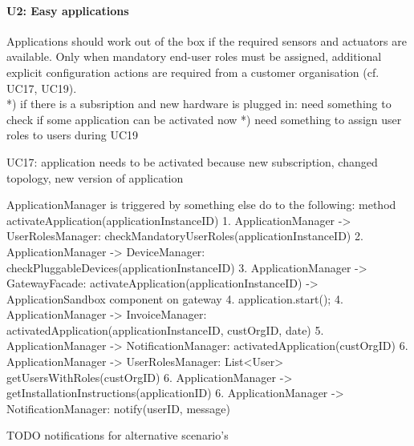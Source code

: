     \paragraph{U2: Easy applications}
        Applications should work out of the box if the required sensors and
        actuators are available. Only when mandatory end-user roles must be
        assigned, additional explicit configuration actions are required
        from a customer organisation (cf. UC17, UC19). \\
        *) if there is a subsription and new hardware is plugged in: need something to check
           if some application can be activated now
        *) need something to assign user roles to users during UC19

        UC17:
            application needs to be activated because new subscription, changed topology, new version of application

            ApplicationManager is triggered by something else do to the following: method activateApplication(applicationInstanceID)
            1. ApplicationManager -> UserRolesManager: checkMandatoryUserRoles(applicationInstanceID)
            2. ApplicationManager -> DeviceManager: checkPluggableDevices(applicationInstanceID)
            3. ApplicationManager -> GatewayFacade: activateApplication(applicationInstanceID) -> ApplicationSandbox component on gateway
            4. application.start();
            4. ApplicationManager -> InvoiceManager: activatedApplication(applicationInstanceID, custOrgID, date)
            5. ApplicationManager -> NotificationManager: activatedApplication(custOrgID)
            6. ApplicationManager -> UserRolesManager: List<User> getUsersWithRoles(custOrgID)
            6. ApplicationManager -> getInstallationInstructions(applicationID)
            6. ApplicationManager -> NotificationManager: notify(userID, message)

            TODO notifications for alternative scenario's

